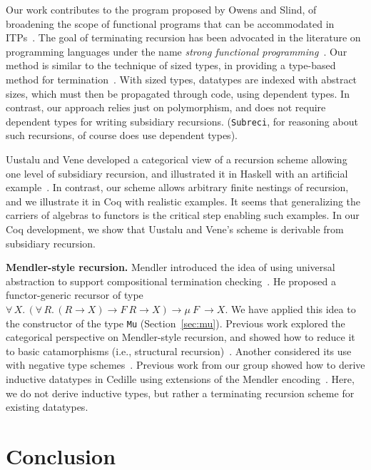 \documentclass[a4paper,USenglish]{lipics-v2021}
\newcommand{\all}[2]{\forall\, #1.\, #2}
\begin{document}
Our work contributes to the program proposed by Owens and Slind, of
broadening the scope of functional programs that can be accommodated
in ITPs~\cite{owens+08}.  The goal of terminating recursion has been
advocated in the literature on programming languages under the name
\emph{strong functional programming}~\cite{turner95}.  Our method is
similar to the technique of sized types, in providing a type-based
method for termination~\cite{barthe04}.  With sized types, datatypes
are indexed with abstract sizes, which must then be propagated through
code, using dependent types.  In contrast, our approach relies just on
polymorphism, and does not require dependent types for writing
subsidiary recursions.  (\verb|Subreci|, for reasoning about such
recursions, of course does use dependent types).

Uustalu and Vene developed a categorical view of a recursion scheme
allowing one level of subsidiary recursion, and illustrated it in
Haskell with an artificial example~\cite{uustalu11}.  In contrast, our
scheme allows arbitrary finite nestings of recursion, and we
illustrate it in Coq with realistic examples.  It seems that
generalizing the carriers of algebras to functors is the critical step
enabling such examples. In our Coq development, we show that Uustalu
and Vene's scheme is derivable from subsidiary recursion.

\textbf{Mendler-style recursion.}  Mendler introduced the idea of
using universal abstraction to support compositional termination
checking~\cite{mendler91}.  He proposed a functor-generic recursor of
type $\all{X}{(\all{R}{(R \to X) \to F\ R \to X}) \to \mu\ F\ \to
  X}$. We have applied this idea to the constructor of the type
\verb|Mu| (Section~\ref{sec:mu}).  Previous work explored the
categorical perspective on Mendler-style recursion, and showed how to
reduce it to basic catamorphisms (i.e., structural
recursion)~\cite{uustalu99}.  Another considered its use with negative
type schemes~\cite{ahn11}.  Previous work from our group showed how to
derive inductive datatypes in Cedille using extensions of the Mendler
encoding~\cite{firsov+18b,firsov+18a}.  Here, we do not derive
inductive types, but rather
a terminating recursion scheme for existing datatypes.

\section{Conclusion}
\end{document}
